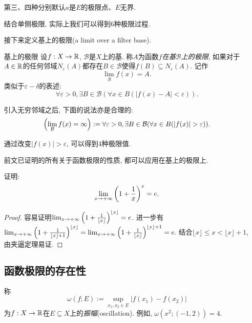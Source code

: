 \begin{remark}
	第三、四种分别默认$a$是$E$的极限点、$E$无界. 
\end{remark}

结合单侧极限, 实际上我们可以得到6种极限过程. 

接下来定义基上的极限(a limit over a filter base). 

\begin{definition}{基上的极限}
	设$f:X \to \mathbb{R}$, $\mathcal{B}$是$X$上的基. 称$A$为函数$f$\textit{在基$\mathcal{B}$上的极限}, 如果对于$A \in \mathbb{R}$的任何邻域$N_{\varepsilon}(A)$都存在$B \in \mathcal{B}$使得$f(B) \subseteq N_{\varepsilon}(A)$. 记作$$\lim_{\mathcal{B}}f(x)=A.$$
	类似于$\varepsilon - \delta$的表述: $$\forall \varepsilon > 0, \exists B \in \mathcal{B}(\forall x \in B (|f(x)-A|<\varepsilon)).$$
\end{definition}

引入无穷邻域之后, 下面的说法亦是合理的: $$\ssb{\lim_{\mathcal{B}} f(x) = \infty }:=\forall \varepsilon > 0, \exists B \in \mathcal{B} (\forall x \in B (|f(x)|>\varepsilon)).$$

通过改变$|f(x)|>\varepsilon$, 可以得到4种极限值. 

前文已证明的所有关于函数极限的性质, 都可以应用在基上的极限上. 

\begin{example}
	证明: $$\lim_{x\to +\infty} \left( 1+\frac{1}{x} \right)^x = e.$$
\end{example}
\begin{proof}
	容易证明$\lim_{x\to +\infty} \left( 1+\frac{1}{\lfloor x \rfloor} \right)^{\lfloor x \rfloor} = e$. 进一步有$\lim_{x\to +\infty} \left( 1+\frac{1}{\lfloor x \rfloor + 1} \right)^{\lfloor x \rfloor} = \lim_{x\to +\infty} \left( 1+\frac{1}{\lfloor x \rfloor} \right)^{\lfloor x \rfloor + 1} = e$. 结合$\lfloor x \rfloor \leq x < \lfloor x \rfloor +1$, 由夹逼定理易证. 
\end{proof}

\subsection{函数极限的存在性}

称$$\omega (f;E):=\sup_{x_1,x_2 \in E} |f(x_1)-f(x_2)|$$为$f:X \to \mathbb{R}$在$E \subseteq X$上的\textit{振幅}(oscillation). 例如, $\omega (x^2;(-1,2))=4$. 

